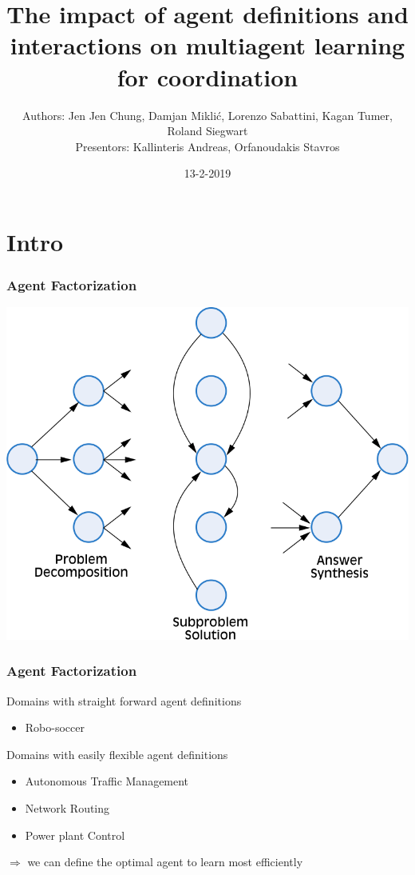 \documentclass{beamer}
\title{The impact of agent definitions and interactions on multiagent learning for coordination} %
\author{Authors: Jen Jen Chung, Damjan Miklić, Lorenzo Sabattini, Kagan Tumer, Roland Siegwart
\\ Presentors: Kallinteris Andreas, Orfanoudakis Stavros}
\date{13-2-2019} %
\begin{document}
	\begin{frame}
		\maketitle %
	\end{frame}

	\section{Intro}
	\begin{frame}
		\frametitle{Agent Factorization}
		\includegraphics[height=0.9\textheight,width=\textwidth]{agent-factor.png}
	\end{frame}
	\begin{frame}
		\frametitle{Agent Factorization}
		Domains with straight forward agent definitions
		\begin{itemize}
			\item Robo-soccer
		\end{itemize}
		Domains with easily flexible agent definitions
		\begin{itemize}
			\item Autonomous Traffic Management
			\item Network Routing
			\item Power plant Control
		\end{itemize}
		$\Rightarrow$ we can define the optimal agent to learn most efficiently
	\end{frame}
\end{document}
